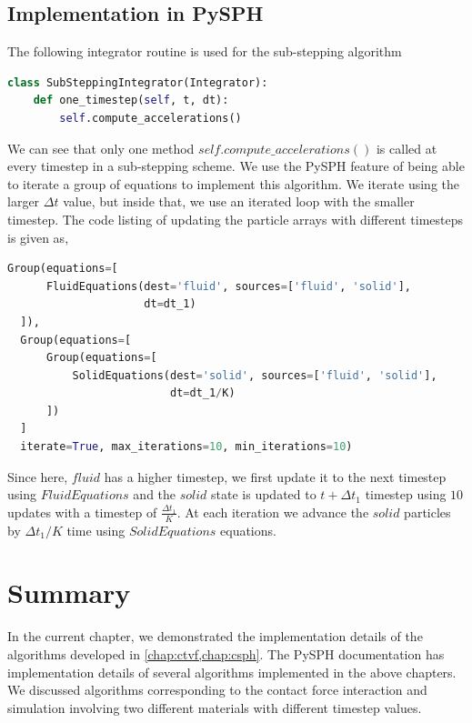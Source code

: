\subsection{Implementation in PySPH}
\label{sec:pysph-substepping-algorithm}
The following integrator routine is used for the sub-stepping algorithm
\lstset{basicstyle=\footnotesize\ttfamily}
\begin{lstlisting}[label={contact:equations},frame=lines,language=Python,upquote=True]
class SubSteppingIntegrator(Integrator):
    def one_timestep(self, t, dt):
        self.compute_accelerations()
\end{lstlisting}
We can see that only one method $self.compute\_accelerations()$ is
called at every timestep in a sub-stepping scheme. We use the PySPH feature of
being able to iterate a group of equations to implement this algorithm. We
iterate using the larger $\Delta t$ value, but inside that, we use an iterated
loop with the smaller timestep. The code listing of updating the particle
arrays with different timesteps is given as,
\lstset{basicstyle=\footnotesize\ttfamily}
\begin{lstlisting}[label={contact:equations},frame=lines,language=Python,upquote=True]
  Group(equations=[
      FluidEquations(dest='fluid', sources=['fluid', 'solid'],
                     dt=dt_1)
  ]),
  Group(equations=[
      Group(equations=[
          SolidEquations(dest='solid', sources=['fluid', 'solid'],
                         dt=dt_1/K)
      ])
  ]
  iterate=True, max_iterations=10, min_iterations=10)
\end{lstlisting}
Since here, $fluid$ has a higher timestep, we first update it to the next
timestep using $FluidEquations$ and the $solid$ state is updated to $t + \Delta t_1$
timestep using $10$ updates with a timestep of $\frac{\Delta t_1}{K}$. At each
iteration we advance the $solid$ particles by $\Delta t_1 / K$ time using
$SolidEquations$ equations.


\FloatBarrier%
\section{Summary}
\label{sec:id:summary}
In the current chapter, we demonstrated the implementation details of the
algorithms developed in \cref{chap:ctvf,chap:csph}. The PySPH documentation has
implementation details of several algorithms implemented in the above chapters.
We discussed algorithms corresponding to the contact force interaction and
simulation involving two different materials with different timestep values.

